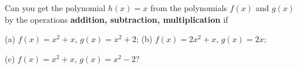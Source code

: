 Can you get the polynomial $h(x) = x$ from the polynomials $f(x)$ and $g(x)$ by the operations \textbf{addition, subtraction, multiplication} if

(a) $f(x) = x^2 + x$, $g(x) = x^2 + 2$; (b) $f(x) = 2x^2 + x$, $g(x) = 2x$;

(c) $f(x) = x^2 + x$, $g(x) = x^2 - 2$?
